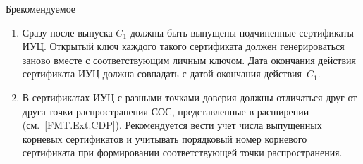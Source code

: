\begin{appendix}{Б}{рекомендуемое}
\begin{enumerate}
\item
Сразу после выпуска $C_1$ должны быть выпущены подчиненные сертификаты ИУЦ. 
%
Открытый ключ каждого такого сертификата должен генерироваться заново вместе с 
соответствующим личным ключом.
%
Дата окончания действия сертификата ИУЦ должна совпадать с датой окончания 
действия~$C_1$.

\item
В сертификатах ИУЦ с разными точками доверия должны отличаться друг от друга
точки распространения СОС, представленные в расширении
 (см.~\ref{FMT.Ext.CDP}).
%
Рекомендуется вести учет числа выпущенных корневых сертификатов и учитывать
порядковый номер корневого сертификата при формировании соответствующей точки 
распространения.
\end{enumerate}

\end{appendix}

